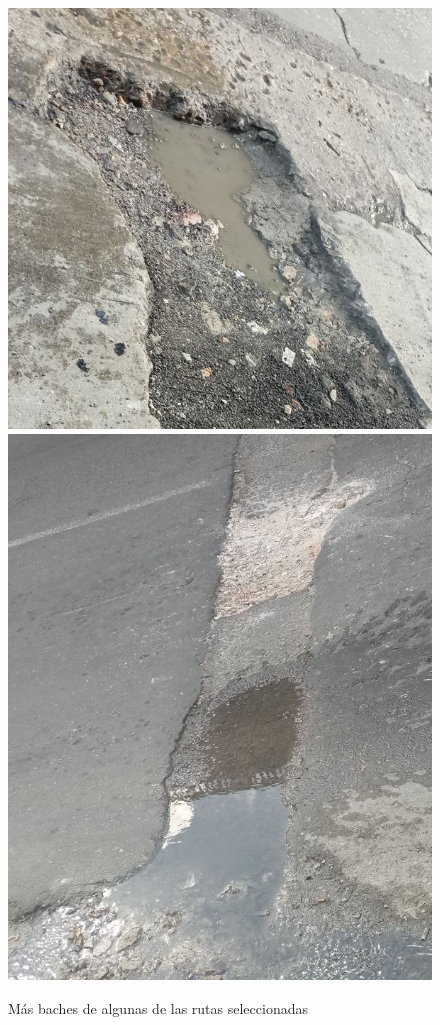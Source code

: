 \begin{appendices}
		\newpage
		\begin{figure}[htb]
			\centering
			\includegraphics[scale = 0.3]{Graphics/pothole_1.jpg}
			\includegraphics[scale = 0.3]{Graphics/pothole_2.jpg}
			\caption{Más baches de algunas de las rutas seleccionadas}
			\label{fig:20}
		\end{figure}
		\newpage


\end{appendices}
